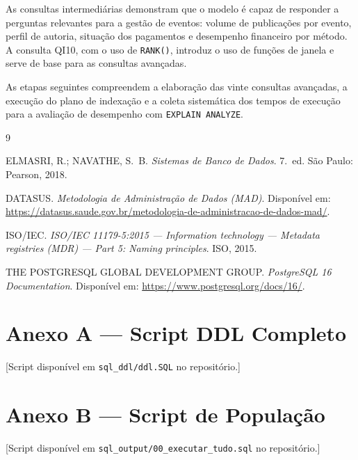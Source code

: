 \documentclass[12pt,a4paper]{article}
\begin{document}
As consultas intermediárias demonstram que o modelo é capaz de responder a perguntas relevantes para a gestão de eventos: volume de publicações por evento, perfil de autoria, situação dos pagamentos e desempenho financeiro por método. A consulta QI10, com o uso de \texttt{RANK()}, introduz o uso de funções de janela e serve de base para as consultas avançadas.

As etapas seguintes compreendem a elaboração das vinte consultas avançadas, a execução do plano de indexação e a coleta sistemática dos tempos de execução para a avaliação de desempenho com \texttt{EXPLAIN ANALYZE}.

\begin{thebibliography}{9}

ELMASRI, R.; NAVATHE, S.~B.
\emph{Sistemas de Banco de Dados}. 7.~ed. São Paulo: Pearson, 2018.

DATASUS.
\emph{Metodologia de Administração de Dados (MAD)}.
Disponível em: \url{https://datasus.saude.gov.br/metodologia-de-administracao-de-dados-mad/}.

ISO/IEC.
\emph{ISO/IEC 11179-5:2015 --- Information technology --- Metadata registries (MDR) --- Part 5: Naming principles}.
ISO, 2015.

THE POSTGRESQL GLOBAL DEVELOPMENT GROUP.
\emph{PostgreSQL 16 Documentation}.
Disponível em: \url{https://www.postgresql.org/docs/16/}.

\end{thebibliography}

\appendix
\section{Anexo A --- Script DDL Completo}
\label{anx:ddl}
% 
[Script disponível em \texttt{sql\_ddl/ddl.SQL} no repositório.]

\section{Anexo B --- Script de População}
\label{anx:populacao}
% 
[Script disponível em \texttt{sql\_output/00\_executar\_tudo.sql} no repositório.]
\end{document}
